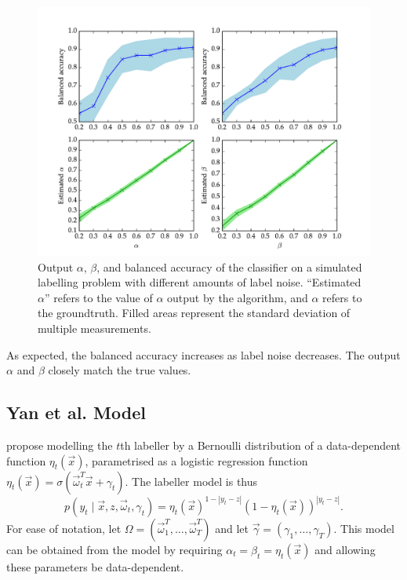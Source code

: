             \begin{figure}[!ht]
                \centering
                \includegraphics[width=\textwidth]{images/experiments/raykar_noise}
                \caption{Output $\alpha$, $\beta$, and balanced accuracy of the
                    \citeauthor{raykar10} classifier on a simulated labelling
                    problem with different amounts of label noise. ``Estimated
                    $\alpha$'' refers to the value of $\alpha$ output by the
                    algorithm, and $\alpha$ refers to the groundtruth. Filled areas
                    represent the standard deviation of multiple measurements.}
                \label{fig:raykar-noise}
            \end{figure}

            As expected, the balanced accuracy increases as label noise decreases.
            The output $\alpha$ and $\beta$ closely match the true values.

    \subsection{Yan et al. Model}
    \label{sec:yan}


        \citet{yan10} propose modelling the $t$th labeller by a Bernoulli distribution of a data-dependent function $\eta_t(\vec x)$, parametrised as a logistic regression function $\eta_t(\vec x) = \sigma(\vec \omega_t^T \vec x + \gamma_t)$. The labeller model is thus
        \begin{equation*}
            p(y_t \mid \vec x, z, \vec \omega_t, \gamma_t) = \eta_t(\vec x)^{1 - |y_t - z|} (1 - \eta_t(\vec x))^{|y_t - z|}.
        \end{equation*}
        For ease of notation, let $\Omega = (\vec \omega_1^T, \dots, \vec \omega_T^T)$ and let $\vec \gamma = (\gamma_1, \dots, \gamma_T)$. This model can be obtained from the \citeauthor{raykar10} model by requiring $\alpha_t = \beta_t = \eta_t(\vec x)$ and allowing these parameters be data-dependent.

